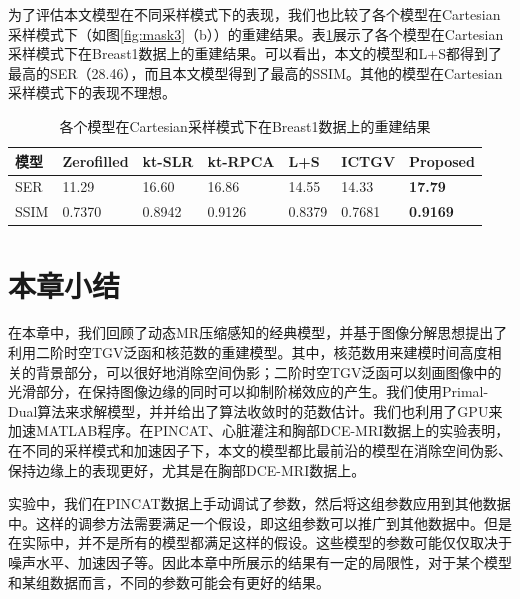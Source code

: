 为了评估本文模型在不同采样模式下的表现，我们也比较了各个模型在Cartesian采样模式下（如图\ref{fig:mask3}（b））的重建结果。表\ref{tab:cartesian}展示了各个模型在Cartesian采样模式下在Breast1数据上的重建结果。可以看出，本文的模型和L+S都得到了最高的SER（28.46），而且本文模型得到了最高的SSIM。其他的模型在Cartesian采样模式下的表现不理想。
\begin{table}
\centering
\caption{各个模型在Cartesian采样模式下在Breast1数据上的重建结果}
\begin{center}
\begin{tabular}{|l|l|l|l|l|l|l|}
\hline
\hline
模型 & Zerofilled & kt-SLR & kt-RPCA & L+S & ICTGV & Proposed \\
\hline
SER & 11.29 & 16.60 & 16.86 & 14.55 & 14.33 & \textbf{17.79} \\
\hline
SSIM & 0.7370 & 0.8942 & 0.9126 & 0.8379 & 0.7681 & \textbf{0.9169}\\
\hline
\end{tabular}
\end{center}
\label{tab:cartesian}
\end{table}

\section{本章小结}
在本章中，我们回顾了动态MR压缩感知的经典模型，并基于图像分解思想提出了利用二阶时空TGV泛函和核范数的重建模型。其中，核范数用来建模时间高度相关的背景部分，可以很好地消除空间伪影；二阶时空TGV泛函可以刻画图像中的光滑部分，在保持图像边缘的同时可以抑制阶梯效应的产生。我们使用Primal-Dual算法来求解模型，并并给出了算法收敛时的范数估计。我们也利用了GPU来加速MATLAB程序。在PINCAT、心脏灌注和胸部DCE-MRI数据上的实验表明，在不同的采样模式和加速因子下，本文的模型都比最前沿的模型在消除空间伪影、保持边缘上的表现更好，尤其是在胸部DCE-MRI数据上。

实验中，我们在PINCAT数据上手动调试了参数，然后将这组参数应用到其他数据中。这样的调参方法需要满足一个假设，即这组参数可以推广到其他数据中。但是在实际中，并不是所有的模型都满足这样的假设。这些模型的参数可能仅仅取决于噪声水平、加速因子等。因此本章中所展示的结果有一定的局限性，对于某个模型和某组数据而言，不同的参数可能会有更好的结果。


















